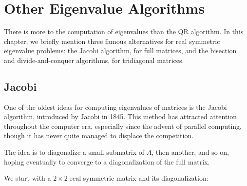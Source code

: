 \chapter{Other Eigenvalue Algorithms}

There is more to the computation of eigenvalues than the QR algorithm. In this chapter, we briefly mention three famous alternatives for real symmetric eigenvalue problems: the Jacobi algorithm, for full matrices, and the bisection and divide-and-conquer algorithms, for tridiagonal matrices.

\section{Jacobi} 
One of the oldest ideas for computing eigenvalues of matrices is the Jacobi algorithm, introduced by Jacobi in 1845. This method has attracted attention throughout the computer era, especially since the advent of parallel computing, though it has never quite managed to displace the competition.   

The idea is to diagonalize a small submatrix of $A$, then another, and so on, hoping eventually to converge to a diagonalization of the full matrix. 

We start with a $ 2\times 2 $ real symmetric matrix and its diagonalization: 

